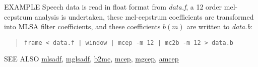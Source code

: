 \begin{options}
\end{options}

\begin{qsection}{EXAMPLE}
Speech data is read in float format from {\em data.f},
a 12 order mel-cepstrum analysis is undertaken,
these mel-cepstrum coefficients are transformed into
MLSA filter coefficients, and these coefficients $b(m)$
are written to {\em data.b}:
\begin{quote}
 \verb!frame < data.f | window | mcep -m 12 | mc2b -m 12 > data.b!
\end{quote} 
\end{qsection}

\begin{qsection}{SEE ALSO}
\hyperlink{mlsadf}{mlsadf},
\hyperlink{mglsadf}{mglsadf},
\hyperlink{b2mc}{b2mc},
\hyperlink{mcep}{mcep},
\hyperlink{mgcep}{mgcep},
\hyperlink{amcep}{amcep}
\end{qsection}
